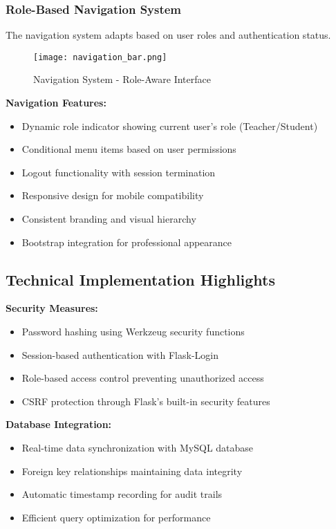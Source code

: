 \documentclass[12pt,a4paper]{article}
\begin{document}
\subsubsection{Role-Based Navigation System}
The navigation system adapts based on user roles and authentication status.

\begin{figure}[h]
\centering
\texttt{[image: navigation\_bar.png]}
\caption{Navigation System - Role-Aware Interface}
\label{fig:navigation}
\end{figure}

\textbf{Navigation Features:}
\begin{itemize}
    \item Dynamic role indicator showing current user's role (Teacher/Student)
    \item Conditional menu items based on user permissions
    \item Logout functionality with session termination
    \item Responsive design for mobile compatibility
    \item Consistent branding and visual hierarchy
    \item Bootstrap integration for professional appearance
\end{itemize}

\subsection{Technical Implementation Highlights}

\textbf{Security Measures:}
\begin{itemize}
    \item Password hashing using Werkzeug security functions
    \item Session-based authentication with Flask-Login
    \item Role-based access control preventing unauthorized access
    \item CSRF protection through Flask's built-in security features
\end{itemize}

\textbf{Database Integration:}
\begin{itemize}
    \item Real-time data synchronization with MySQL database
    \item Foreign key relationships maintaining data integrity
    \item Automatic timestamp recording for audit trails
    \item Efficient query optimization for performance
\end{itemize}
\end{document}
